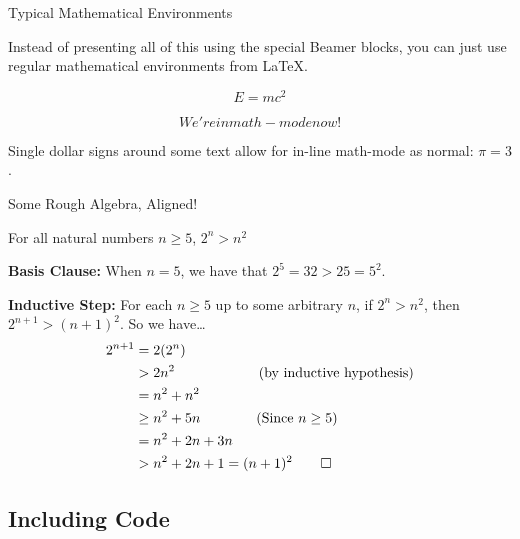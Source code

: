 \documentclass{beamer}
\begin{document}
\begin{frame}{Typical Mathematical Environments}
	
	Instead of presenting all of this using the special Beamer blocks, you can just use regular mathematical environments from \LaTeX.
	
	\begin{equation}						%
		E = mc^2
	\end{equation}
	
	\[ We're in math-mode now!\]
	
	\bigskip
	
	Single dollar signs around some text allow for in-line math-mode as normal: $\pi = 3$.
	
\end{frame}


\begin{frame}{Some Rough Algebra, Aligned!}

	\begin{theorem}
		For all natural numbers $n\geq5$, $2^n>n^2$
	\end{theorem}
	
	\vfill
	
	\footnotesize{
	{\bf Basis Clause:} When $n=5$, we have that $2^5 = 32 > 25 = 5^2$. 
	
	\medskip
		
	{\bf Inductive Step:} For each $n\geq5$ up to some arbitrary $n$, if $2^n > n^2$, then $2^{n+1} > (n+1)^2$. So we have\dots
		\begin{align*}						%
			2^{n+1} &= 2(2^n)\\
			&> 2n^2\qquad\qquad\qquad (\textrm{by inductive hypothesis})\\
			&= n^2 + n^2\\
			&\geq n^2 + 5n\qquad\qquad (\textrm{Since } n\geq5)\\
			&= n^2 + 2n + 3n\\
			&> n^2 + 2n + 1 = (n + 1)^2\qed
		\end{align*}}						

\end{frame}

\subsection{Including Code}
\end{document}

